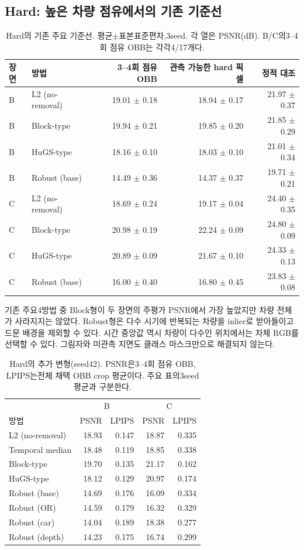 \documentclass[11pt,a4paper]{article}
\begin{document}
\subsection{Hard: 높은 차량 점유에서의 기존 기준선}
\begin{table}[htbp]\centering\small
\caption{Hard의 기존 주요 기준선. 평균$\pm$표본표준편차,3seed. 각 열은 PSNR(dB). B/C의3--4회 점유 OBB는 각각4/17개다.}
\begin{tabular}{llrrr}\toprule 장면 & 방법 & 3--4회 점유 OBB & 관측 가능한 hard 픽셀 & 정적 대조\\\midrule
B & L2 (no-removal) & 19.01 $\pm$ 0.18 & 18.94 $\pm$ 0.17 & 21.97 $\pm$ 0.37 \\
B & Block-type & 19.94 $\pm$ 0.21 & 19.85 $\pm$ 0.20 & 21.85 $\pm$ 0.29 \\
B & HuGS-type & 18.16 $\pm$ 0.10 & 18.03 $\pm$ 0.10 & 21.01 $\pm$ 0.34 \\
B & Robust (base) & 14.49 $\pm$ 0.36 & 14.37 $\pm$ 0.37 & 19.71 $\pm$ 0.21 \\
C & L2 (no-removal) & 18.69 $\pm$ 0.24 & 19.17 $\pm$ 0.04 & 24.40 $\pm$ 0.35 \\
C & Block-type & 20.98 $\pm$ 0.19 & 22.24 $\pm$ 0.09 & 24.80 $\pm$ 0.09 \\
C & HuGS-type & 20.89 $\pm$ 0.09 & 21.67 $\pm$ 0.10 & 24.33 $\pm$ 0.13 \\
C & Robust (base) & 16.00 $\pm$ 0.40 & 16.80 $\pm$ 0.45 & 23.83 $\pm$ 0.08 \\\bottomrule\end{tabular}\end{table}

기존 주요4방법 중 Block형이 두 장면의 주평가 PSNR에서 가장 높았지만 차량 전체가 사라지지는 않았다. Robust형은 다수 시기에 반복되는 차량을 inlier로 받아들이고 드문 배경을 제외할 수 있다. 시간 중앙값 역시 차량이 다수인 위치에서는 차체 RGB를 선택할 수 있다. 그림자와 미관측 지면도 클래스 마스크만으로 해결되지 않는다.
\begin{table}[htbp]\centering\small
\caption{Hard의 추가 변형(seed42). PSNR은3--4회 점유 OBB, LPIPS는전체 채택 OBB crop 평균이다. 주요 표의3seed 평균과 구분한다.}
\begin{tabular}{lrrrr}\toprule & \multicolumn{2}{c}{B} & \multicolumn{2}{c}{C}\\ 방법 & PSNR & LPIPS & PSNR & LPIPS\\\midrule
L2 (no-removal) & 18.93 & 0.147 & 18.87 & 0.335 \\
Temporal median & 18.48 & 0.119 & 18.85 & 0.338 \\
Block-type & 19.70 & 0.135 & 21.17 & 0.162 \\
HuGS-type & 18.12 & 0.129 & 20.97 & 0.174 \\
Robust (base) & 14.69 & 0.176 & 16.09 & 0.334 \\
Robust (OR) & 14.59 & 0.179 & 16.32 & 0.329 \\
Robust (car) & 14.04 & 0.189 & 18.38 & 0.277 \\
Robust (depth) & 14.23 & 0.175 & 16.74 & 0.299 \\\bottomrule\end{tabular}\end{table}
\end{document}
